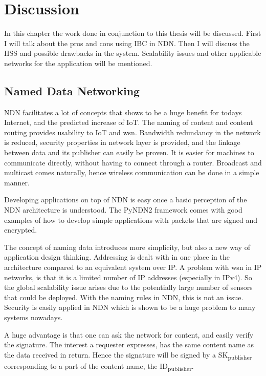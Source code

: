 \chapter{Discussion}
In this chapter the work done in conjunction to this thesis will be discussed. 
First I will talk about the pros and cons using \gls{IBC} in \gls{NDN}.
Then I will discuss the \gls{HSS} and possible drawbacks in the system. 
Scalability issues and other applicable networks for the application will be mentioned.

\section{Named Data Networking}
\gls{NDN} facilitates a lot of concepts that shows to be a huge benefit for todays Internet, and the predicted increase of \gls{IoT}.
The naming of content and content routing provides usability to \gls{IoT} and \gls{wsn}.
Bandwidth redundancy in the network is reduced, security properties in network layer is provided, and the linkage between data and its publisher can easily be proven. 
It is easier for machines to communicate directly, without having to connect through a router.
Broadcast and multicast comes naturally, hence wireless communication can be done in a simple manner.

Developing applications on top of \gls{NDN} is easy once a basic perception of the \gls{NDN} architecture is understood.
The \gls{PyNDN2} framework comes with good examples of how to develop simple applications with packets that are signed and encrypted.

The concept of naming data introduces more simplicity, but also a new way of application design thinking.
Addressing is dealt with in one place in the architecture compared to an equivalent system over \gls{IP}. 
A problem with \gls{wsn} in \gls{IP} networks, is that it is a limited number of \gls{IP} addresses (especially in \gls{IPv4}).
So the global scalability issue arises due to the potentially large number of sensors that could be deployed. 
With the naming rules in \gls{NDN}, this is not an issue.
Security is easily applied in \gls{NDN} which is shown to be a huge problem to many systems nowadays.

A huge advantage is that one can ask the network for content, and easily verify the signature.
The \gls{interest} a \gls{requester} expresses, has the same content name as the \gls{data} received in return.
Hence the signature will be signed by a \gls{SK}\textsubscript{publisher} corresponding to a part of the content name, the \gls{ID}\textsubscript{publisher}.

